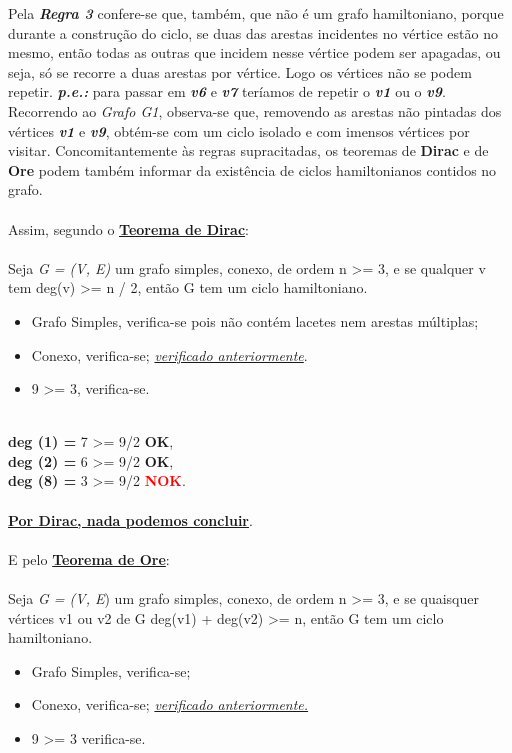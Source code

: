 \documentclass{report}
\begin{document}
Pela \textit{\textbf{Regra 3}} confere-se que, também, que não é um grafo hamiltoniano, porque durante a construção do ciclo, se duas das arestas incidentes no vértice estão no mesmo, então todas as outras que incidem nesse vértice podem ser apagadas, ou seja, só se recorre a duas arestas por vértice. Logo os vértices não se podem repetir. \textbf{\textit{p.e.:}} para passar em \textit{\textbf{v6}} e \textit{\textbf{v7}} teríamos de repetir o \textit{\textbf{v1}} ou o \textbf{\textit{v9}}. Recorrendo ao \textit{Grafo G1}, observa-se que, removendo as arestas não pintadas dos vértices \textbf{\textit{v1}} e \textbf{\textit{v9}}, obtém-se com um ciclo isolado e com imensos vértices por visitar. Concomitantemente às regras supracitadas, os teoremas de \textbf{Dirac} e de \textbf{Ore} podem também informar da existência de ciclos hamiltonianos contidos no grafo.\\\\
Assim, segundo o \underline{\textbf{Teorema de Dirac}}:
\\\\
Seja \textit{G = (V, E)} um grafo simples, conexo, de ordem n >= 3, e se qualquer v tem deg(v) >= n / 2, então G tem um ciclo hamiltoniano.
\begin{itemize}
\item Grafo Simples, verifica-se pois não contém lacetes nem arestas múltiplas;
\item Conexo, verifica-se; \underline{\textit{verificado anteriormente}}.
\item 9 >= 3, verifica-se.
\end{itemize}
\\
\textbf{deg (1) =} 7 >= 9/2 \textbf{OK},\\
\textbf{deg (2) =} 6 >= 9/2 \textbf{OK},\\
\textbf{deg (8) =} 3 >= 9/2 \textbf{\textcolor{red}{NOK}}.
\\\\
\underline{\textbf{Por Dirac, nada podemos concluir}}.\\
\\
E pelo \underline{\textbf{Teorema de Ore}}:\\
\\
Seja \textit{G = (V, E}) um grafo simples, conexo, de ordem n >= 3, e se quaisquer vértices v1 ou v2 de G deg(v1) + deg(v2) >= n, então G tem um ciclo hamiltoniano.
\\
\begin{itemize}
\item Grafo Simples, verifica-se;
\item Conexo, verifica-se; \underline{\textit{verificado anteriormente.}}
\item 9 >= 3 verifica-se.
\end{itemize}
\end{document}
